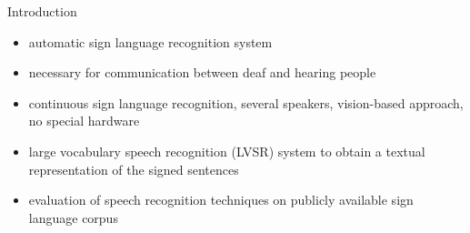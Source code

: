 \documentclass[final]{beamer}
\begin{document}
\begin{frame}{}
\begin{columns}[t]
\begin{column}{.3\linewidth}
      \begin{block}{Introduction}
        \begin{itemize}
        \item automatic sign language recognition system                                    %
        \item \alert{necessary for communication} between deaf and
          hearing people
        \item \alert{continuous} sign language recognition,
          \alert{several} speakers, \alert{vision-based} approach, \alert{no
            special hardware}
        \item large vocabulary speech recognition (LVSR) system to
          obtain a textual representation of the signed
          sentences 
        \item evaluation of speech recognition techniques on \alert{publicly
          available sign language
          corpus}
        \end{itemize}
      \end{block}

    \end{column}

  \end{columns}


  \vfill
\end{frame}
\end{document}
